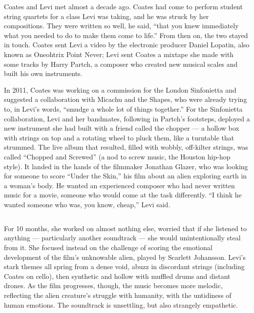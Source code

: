 Coates and Levi met almost a decade ago. Coates had come to perform
student string quartets for a class Levi was taking, and he was struck
by her compositions. They were written so well, he said, ``that you knew
immediately what you needed to do to make them come to life.'' From then
on, the two stayed in touch. Coates sent Levi a video by the electronic
producer Daniel Lopatin, also known as Oneohtrix Point Never; Levi sent
Coates a mixtape she made with some tracks by Harry Partch, a composer
who created new musical scales and built his own instruments.

In 2011, Coates was working on a commission for the London Sinfonietta
and suggested a collaboration with Micachu and the Shapes, who were
already trying to, in Levi's words, ``smudge a whole lot of things
together.'' For the Sinfonietta collaboration, Levi and her bandmates,
following in Partch's footsteps, deployed a new instrument she had built
with a friend called the chopper --- a hollow box with strings on top
and a rotating wheel to pluck them, like a turntable that strummed. The
live album that resulted, filled with wobbly, off-kilter strings, was
called ``Chopped and Screwed'' (a nod to screw music, the Houston
hip-hop style). It landed in the hands of the filmmaker Jonathan Glazer,
who was looking for someone to score ``Under the Skin,'' his film about
an alien exploring earth in a woman's body. He wanted an experienced
composer who had never written music for a movie, someone who would come
at the task differently. ``I think he wanted someone who was, you know,
cheap,'' Levi said.

\hypertarget{-2}{%
\subsection{}\label{-2}}

\hypertarget{-3}{%
\paragraph{}\label{-3}}

For 10 months, she worked on almost nothing else, worried that if she
listened to anything --- particularly another soundtrack --- she would
unintentionally steal from it. She focused instead on the challenge of
scoring the emotional development of the film's unknowable alien, played
by Scarlett Johansson. Levi's stark themes all spring from a dense void,
abuzz in discordant strings (including Coates on cello), then synthetic
and hollow with muffled drums and distant drones. As the film
progresses, though, the music becomes more melodic, reflecting the alien
creature's struggle with humanity, with the untidiness of human
emotions. The soundtrack is unsettling, but also strangely empathetic.

